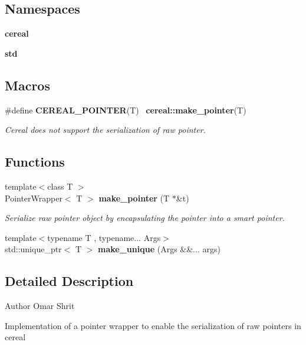 \subsection*{Namespaces}
\begin{DoxyCompactItemize}
\item 
 \textbf{ cereal}
\item 
 \textbf{ std}
\end{DoxyCompactItemize}
\subsection*{Macros}
\begin{DoxyCompactItemize}
\item 
\#define \textbf{ C\+E\+R\+E\+A\+L\+\_\+\+P\+O\+I\+N\+T\+ER}(T)~\textbf{ cereal\+::make\+\_\+pointer}(T)
\begin{DoxyCompactList}\small\item\em Cereal does not support the serialization of raw pointer. \end{DoxyCompactList}\end{DoxyCompactItemize}
\subsection*{Functions}
\begin{DoxyCompactItemize}
\item 
{\footnotesize template$<$class T $>$ }\\Pointer\+Wrapper$<$ T $>$ \textbf{ make\+\_\+pointer} (T $\ast$\&t)
\begin{DoxyCompactList}\small\item\em Serialize raw pointer object by encapsulating the pointer into a smart pointer. \end{DoxyCompactList}\item 
{\footnotesize template$<$typename T , typename... Args$>$ }\\std\+::unique\+\_\+ptr$<$ T $>$ \textbf{ make\+\_\+unique} (Args \&\&... args)
\end{DoxyCompactItemize}


\subsection{Detailed Description}
\begin{DoxyAuthor}{Author}
Omar Shrit
\end{DoxyAuthor}
Implementation of a pointer wrapper to enable the serialization of raw pointers in cereal

